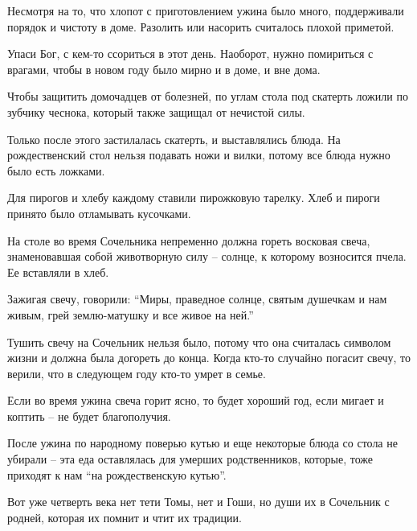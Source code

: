 Несмотря на то, что хлопот с приготовлением ужина было много, поддерживали
порядок и чистоту в доме.  Разолить или насорить считалось плохой приметой.

Упаси Бог, с кем-то ссориться в этот день. Наоборот, нужно помириться с
врагами, чтобы в новом году было мирно и в доме, и вне дома. 

Чтобы защитить домочадцев от болезней, по углам стола под скатерть ложили по
зубчику чеснока, который также защищал от нечистой силы. 

Только после этого застилалась скатерть, и выставлялись блюда. На
рождественский стол нельзя подавать ножи и вилки, потому все блюда нужно было
есть ложками.

Для пирогов и хлебу каждому ставили пирожковую тарелку. Хлеб и пироги принято
было отламывать кусочками.

На столе во время Сочельника непременно должна гореть восковая свеча,
знаменовавшая собой животворную силу – солнце, к которому возносится пчела. Ее
вставляли в хлеб.

Зажигая свечу, говорили: \enquote{Миры, праведное солнце, святым душечкам и нам живым,
грей землю-матушку и все живое на ней.}

Тушить свечу на Сочельник нельзя было, потому что она считалась символом жизни
и должна была догореть до конца. Когда кто-то случайно погасит свечу, то
верили, что в следующем году кто-то умрет в семье. 

Если во время ужина свеча горит ясно, то будет хороший год, если мигает и
коптить – не будет благополучия.

После ужина по народному поверью кутью и еще некоторые блюда со стола не
убирали – эта еда оставлялась для умерших родственников, которые, тоже приходят
к нам \enquote{на рождественскую кутью}. 

Вот уже четверть века нет тети Томы, нет и Гоши, но души их в Сочельник с
родней, которая их помнит и чтит их традиции.
